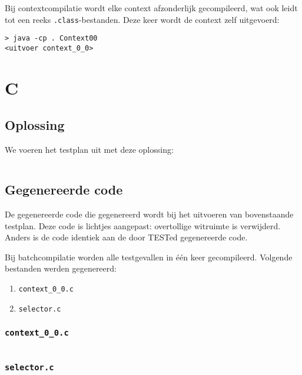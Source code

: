 Bij contextcompilatie wordt elke context afzonderlijk gecompileerd, wat ook leidt tot een reeks \texttt{.class}-bestanden.
Deze keer wordt de context zelf uitgevoerd:

\begin{verbatim}
> java -cp . Context00
<uitvoer context_0_0>
\end{verbatim}

\section{C}\label{sec:echo-function-c}

\subsection{Oplossing}\label{subsec:echo-function-oplossing}

We voeren het testplan uit met deze oplossing:

\inputminted{c}{sources/echo-function/correct.c}

\subsection{Gegenereerde code}\label{subsec:echo-function-c-gegenereerde-code}

De gegenereerde code die gegenereerd wordt bij het uitvoeren van bovenstaande testplan.
Deze code is lichtjes aangepast: overtollige witruimte is verwijderd.
Anders is de code identiek aan de door TESTed gegenereerde code.

Bij batchcompilatie worden alle testgevallen in één keer gecompileerd.
Volgende bestanden werden gegenereerd:

\begin{enumerate}
    \item \texttt{context\_0\_0.c}
    \item \texttt{selector.c}
\end{enumerate}

\subsubsection{\texttt{context\_0\_0.c}}

\inputminted{c}{sources/echo-function/context_0_0.c}

\subsubsection{\texttt{selector.c}}

